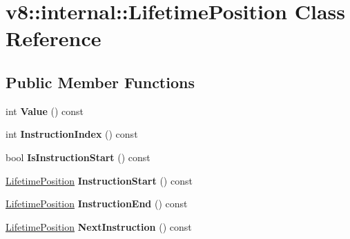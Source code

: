 \hypertarget{classv8_1_1internal_1_1_lifetime_position}{}\section{v8\+:\+:internal\+:\+:Lifetime\+Position Class Reference}
\label{classv8_1_1internal_1_1_lifetime_position}
\subsection*{Public Member Functions}
\begin{DoxyCompactItemize}
\item 
int {\bfseries Value} () const \hypertarget{classv8_1_1internal_1_1_lifetime_position_a571e7248741e5573f1025506e4aecb71}{}\label{classv8_1_1internal_1_1_lifetime_position_a571e7248741e5573f1025506e4aecb71}

\item 
int {\bfseries Instruction\+Index} () const \hypertarget{classv8_1_1internal_1_1_lifetime_position_a7a498629cbc7bc82839b310ec83c934e}{}\label{classv8_1_1internal_1_1_lifetime_position_a7a498629cbc7bc82839b310ec83c934e}

\item 
bool {\bfseries Is\+Instruction\+Start} () const \hypertarget{classv8_1_1internal_1_1_lifetime_position_aa021cee120d284219295efceb21bc4fd}{}\label{classv8_1_1internal_1_1_lifetime_position_aa021cee120d284219295efceb21bc4fd}

\item 
\hyperlink{classv8_1_1internal_1_1_lifetime_position}{Lifetime\+Position} {\bfseries Instruction\+Start} () const \hypertarget{classv8_1_1internal_1_1_lifetime_position_a3a03ef3e810f20e03c5293e9fd39fcc3}{}\label{classv8_1_1internal_1_1_lifetime_position_a3a03ef3e810f20e03c5293e9fd39fcc3}

\item 
\hyperlink{classv8_1_1internal_1_1_lifetime_position}{Lifetime\+Position} {\bfseries Instruction\+End} () const \hypertarget{classv8_1_1internal_1_1_lifetime_position_a8bee4e68757da53c5b38e93dc86bb8e3}{}\label{classv8_1_1internal_1_1_lifetime_position_a8bee4e68757da53c5b38e93dc86bb8e3}

\item 
\hyperlink{classv8_1_1internal_1_1_lifetime_position}{Lifetime\+Position} {\bfseries Next\+Instruction} () const \hypertarget{classv8_1_1internal_1_1_lifetime_position_a167e49987ca14bcf7d4f03ec0e2903e9}{}\label{classv8_1_1internal_1_1_lifetime_position_a167e49987ca14bcf7d4f03ec0e2903e9}


\end{DoxyCompactItemize}

